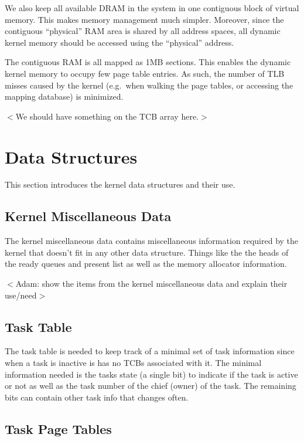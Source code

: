 \documentclass[a4paper,10pt,twoside]{article}
\begin{document}
We also keep all available DRAM in the system in one contiguous block
of virtual memory.  This makes memory management much simpler.
Moreover, since the contiguous ``physical'' RAM area is shared by all
address spaces, all dynamic kernel memory should be accessed using the
``physical'' address.

The contiguous RAM is all mapped as 1MB sections.  This enables the
dynamic kernel memory to occupy few page table entries.  As such, the
number of TLB misses caused by the kernel (e.g.\ when walking the page
tables, or accessing the mapping database) is minimized.

$<$We should have something on the TCB array here.$>$

\newpage
\section{Data Structures}

This section introduces the kernel data structures and their use.

\subsection{Kernel Miscellaneous Data}

The kernel miscellaneous data contains miscellaneous information required by the kernel that doesn't fit in any other data structure. Things like the the heads of the ready queues and present list as well as the memory allocator information.

$<$Adam: show the items from the kernel miscellaneous data and explain their use/need$>$

\subsection{Task Table}

The task table is needed to keep track of a minimal set of task information since when a task is inactive is has no TCBs associated with it. The minimal information needed is the tasks state (a single bit) to indicate if the task is active or not as well as the task number of the chief (owner) of the task. The remaining bits can contain other task info that changes often.

\subsection{Task Page Tables}
\end{document}
